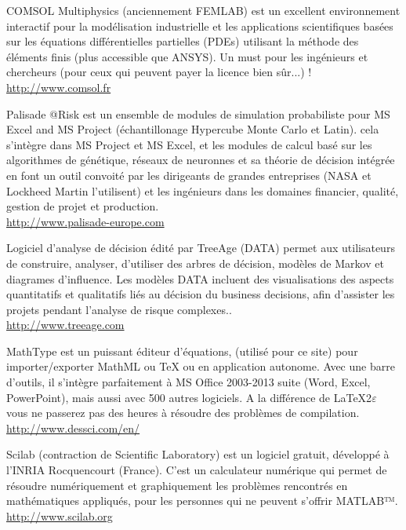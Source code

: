 	{\Large {}}{\Large {}}{\Large {}}{\Large {}}COMSOL Multiphysics (anciennement FEMLAB) est un excellent environnement interactif pour la modélisation industrielle et les applications scientifiques basées sur les équations différentielles partielles (PDEs) utilisant la méthode des éléments finis (plus accessible que ANSYS). Un must pour les ingénieurs et chercheurs (pour ceux qui peuvent payer la licence bien sûr...) !\\
	\href{http://www.comsol.fr}{\color{blue}http://www.comsol.fr}
	
	{\Large {}}{\Large {}}{\Large {}}{\Large {}} Palisade @Risk est un ensemble de modules de simulation probabiliste pour MS Excel and MS Project (échantillonage Hypercube Monte Carlo et Latin). cela s'intègre dans MS Project et MS Excel, et les modules de calcul basé sur les algorithmes de génétique, réseaux de neuronnes et sa théorie de décision intégrée en font un outil convoité par les dirigeants de grandes entreprises (NASA et Lockheed Martin l'utilisent) et les ingénieurs dans les domaines financier, qualité, gestion de projet et production.\\
	\href{http://www.palisade-europe.com}{\color{blue}http://www.palisade-europe.com}
	
	{\Large {}}{\Large {}}{\Large {}}{\Large {}} Logiciel d'analyse de décision édité par TreeAge (DATA) permet aux utilisateurs de construire, analyser, d'utiliser des arbres de décision, modèles de Markov et diagrames d'influence. Les modèles DATA incluent des visualisations des aspects quantitatifs et qualitatifs liés au décision du business decisions, afin d'assister les projets pendant l'analyse de risque complexes..\\
	\href{http://www.treeage.com}{\color{blue}http://www.treeage.com}
	
	{\Large {}}{\Large {}}{\Large {}}{\Large {}} MathType est un puissant éditeur d'équations, (utilisé pour ce site) pour importer/exporter MathML ou TeX ou en application autonome. Avec une barre d'outils, il s'intègre parfaitement à MS Office 2003-2013 suite (Word, Excel, PowerPoint), mais aussi avec 500 autres logiciels. A la différence de \LaTeX 2$\varepsilon$ vous ne passerez pas des heures à résoudre des problèmes de compilation.\\ 
	\href{http://www.dessci.com/en/}{\color{blue}http://www.dessci.com/en/}
	
	{\Large {}}{\Large {}}{\Large {}} Scilab (contraction de Scientific Laboratory) est un logiciel gratuit, développé à l'INRIA Rocquencourt (France). C'est un calculateur numérique qui permet de résoudre numériquement et graphiquement les problèmes rencontrés en mathématiques appliqués, pour les personnes qui ne peuvent s'offrir MATLAB™.\\
	\href{http://www.scilab.org}{\color{blue}http://www.scilab.org}
	
